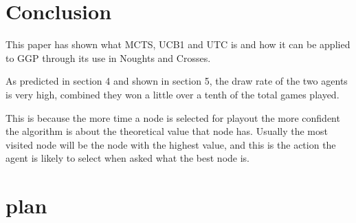 \documentclass[conference]{IEEEtran}
\begin{document}
\section{Conclusion}
This paper has shown what MCTS, UCB1 and UTC is and how it can be applied to GGP through its use in Noughts and Crosses.

As predicted in section 4 and shown in section 5, the draw rate of the two agents is very high, combined they won a little over a tenth of the total games played.

This is because the more time a node is selected for playout the more confident the algorithm is about the theoretical value that node has. Usually the most visited node will be the node with the highest value, and this is the action the agent is likely to select when asked what the best node is.   

\section{plan}
\end{document}
